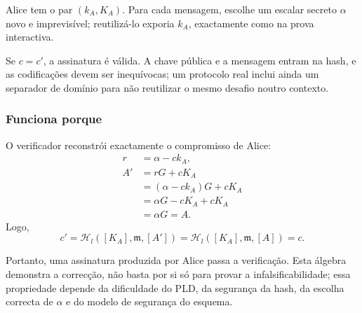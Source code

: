 \fi

Alice tem o par \((k_A,K_A)\). Para cada mensagem, escolhe um escalar secreto
\(\alpha\) novo e imprevisível; reutilizá-lo exporia \(k_A\), exactamente como
na prova interactiva.

\begin{center}
\end{center}

Se \(c=c'\), a assinatura é válida. A chave pública e a mensagem entram na
hash, e as codificações devem ser inequívocas; um protocolo real inclui ainda
um separador de domínio para não reutilizar o mesmo desafio noutro contexto.
  

\subsubsection*{Funciona porque}

%
O verificador reconstrói exactamente o compromisso de Alice:
\begin{align*}
r&=\alpha-ck_A,\\
A'&=rG+cK_A\\
  &=(\alpha-ck_A)G+cK_A\\
  &=\alpha G-cK_A+cK_A\\
  &=\alpha G=A.
\end{align*}
Logo,
\[
c'=\mathcal{H}_l([K_A],\mathfrak{m},[A'])
  =\mathcal{H}_l([K_A],\mathfrak{m},[A])=c.
\]

Portanto, uma assinatura produzida por Alice passa a verificação. Esta álgebra
demonstra a correcção, não basta por si só para provar a infalsificabilidade;
essa propriedade depende da dificuldade do PLD, da segurança da hash, da
escolha correcta de \(\alpha\) e do modelo de segurança do esquema.


